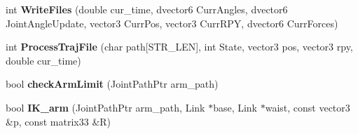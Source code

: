 \begin{DoxyCompactItemize}
\item 
\hypertarget{classAssemblyStrategy_aa9c04cd350cec3fc8a9682b85649c98b}{int {\bfseries Write\-Files} (double cur\-\_\-time, dvector6 Curr\-Angles, dvector6 Joint\-Angle\-Update, vector3 Curr\-Pos, vector3 Curr\-R\-P\-Y, dvector6 Curr\-Forces)}\label{classAssemblyStrategy_aa9c04cd350cec3fc8a9682b85649c98b}

\item 
\hypertarget{classAssemblyStrategy_a15cbf8fbf4107120e03da6e915b1a437}{int {\bfseries Process\-Traj\-File} (char path\mbox{[}S\-T\-R\-\_\-\-L\-E\-N\mbox{]}, int State, vector3 pos, vector3 rpy, double cur\-\_\-time)}\label{classAssemblyStrategy_a15cbf8fbf4107120e03da6e915b1a437}

\item 
\hypertarget{classAssemblyStrategy_a2d3e80441161b7e032d241fbfc4045a6}{bool {\bfseries check\-Arm\-Limit} (Joint\-Path\-Ptr arm\-\_\-path)}\label{classAssemblyStrategy_a2d3e80441161b7e032d241fbfc4045a6}

\item 
\hypertarget{classAssemblyStrategy_ae467edca27cb5c2162c7ee879a1e8ff7}{bool {\bfseries I\-K\-\_\-arm} (Joint\-Path\-Ptr arm\-\_\-path, Link $\ast$base, Link $\ast$waist, const vector3 \&p, const matrix33 \&R)}\label{classAssemblyStrategy_ae467edca27cb5c2162c7ee879a1e8ff7}

\end{DoxyCompactItemize}
